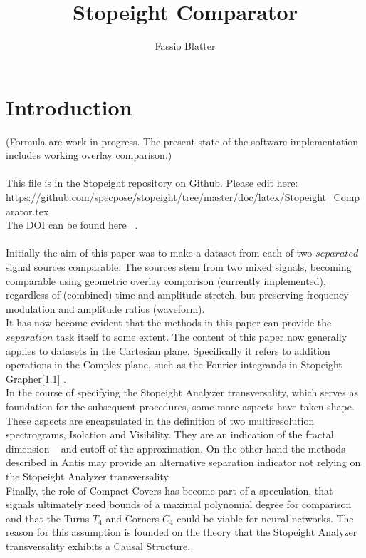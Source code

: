 \documentclass{report}
\begin{document}
\title{Stopeight Comparator}
\author{Fassio Blatter}
\maketitle

\chapter{Introduction}
(Formula are work in progress. The present state of the software implementation includes working overlay comparison.)\\\\
This file is in the Stopeight repository on Github. Please edit here:\\
https://github.com/specpose/stopeight/tree/master/doc/latex/Stopeight\_Comparator.tex\\
The DOI can be found here ~\cite{Analyzer}.\\\\
Initially the aim of this paper was to make a dataset from each of two $separated$ signal sources comparable. The sources stem from two mixed signals, becoming comparable using geometric overlay comparison (currently implemented), regardless of (combined) time and amplitude stretch, but preserving frequency modulation and amplitude ratios (waveform).\\
It has now become evident that the methods in this paper can provide the $separation$ task itself to some extent. The content of this paper now generally applies to datasets in the Cartesian plane. Specifically it refers to addition operations in the Complex plane, such as the Fourier integrands in Stopeight Grapher\cite{Grapher}[1.1] .\\
In the course of specifying the Stopeight Analyzer transversality, which serves as foundation for the subsequent procedures, some more aspects have taken shape. These aspects are encapsulated in the definition of two multiresolution spectrograms, Isolation and Visibility. They are an indication of the fractal dimension ~\cite{Widon} and cutoff of the approximation. On the other hand the methods described in Antis \cite{Antis} may provide an alternative separation indicator not relying on the Stopeight Analyzer transversality.\\
Finally, the role of Compact Covers has become part of a speculation, that signals ultimately need bounds of a maximal polynomial degree for comparison and that the Turns $T_{4}$ and Corners $C_{4}$ could be viable for neural networks. The reason for this assumption is founded on the theory that the Stopeight Analyzer transversality exhibits a Causal Structure.
\end{document}
